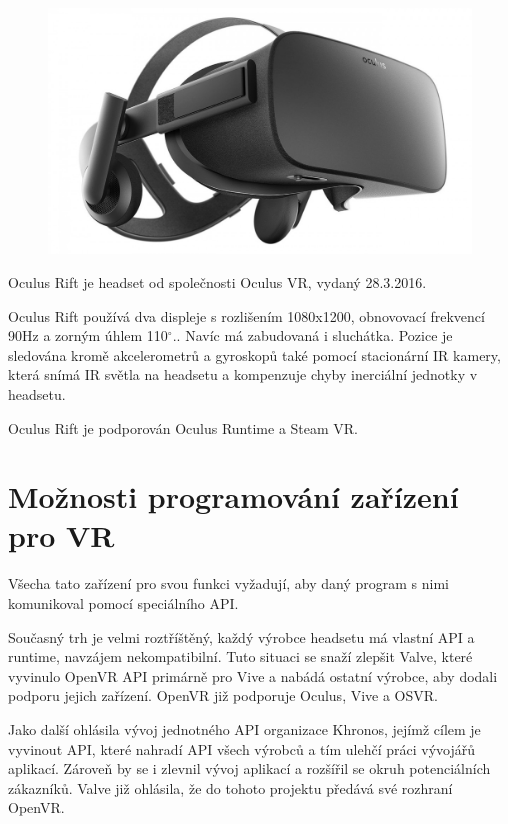 \begin{figure}
	\centering
	\includegraphics[keepaspectratio,width=\textwidth]{obrazky/oculus}
\end{figure}

Oculus Rift je headset od společnosti Oculus VR, vydaný 28.3.2016.

Oculus Rift používá dva displeje s rozlišením 1080x1200, obnovovací frekvencí 90Hz a zorným úhlem 110$ ^{\circ} $.\cite{oculus_rift}. Navíc má zabudovaná i sluchátka. Pozice je sledována kromě akcelerometrů a gyroskopů také pomocí stacionární IR kamery, která snímá IR světla na headsetu a kompenzuje chyby inerciální jednotky v headsetu.

Oculus Rift je podporován Oculus Runtime a Steam VR.

\section{Možnosti programování zařízení pro VR}

Všecha tato zařízení pro svou funkci vyžadují, aby daný program s nimi komunikoval pomocí speciálního API.

Současný trh je velmi roztříštěný, každý výrobce headsetu má vlastní API a runtime, navzájem nekompatibilní. Tuto situaci se snaží zlepšit Valve, které vyvinulo OpenVR API primárně pro Vive a nabádá ostatní výrobce, aby dodali podporu jejich zařízení. OpenVR již podporuje Oculus, Vive a OSVR.

Jako další ohlásila vývoj jednotného API organizace Khronos, jejímž cílem je vyvinout API, které nahradí API všech výrobců a tím ulehčí práci vývojářů aplikací. Zároveň by se i zlevnil vývoj aplikací a rozšířil se okruh potenciálních zákazníků.  Valve již ohlásila, že do tohoto projektu předává své rozhraní OpenVR. \cite{khronos_vr}


